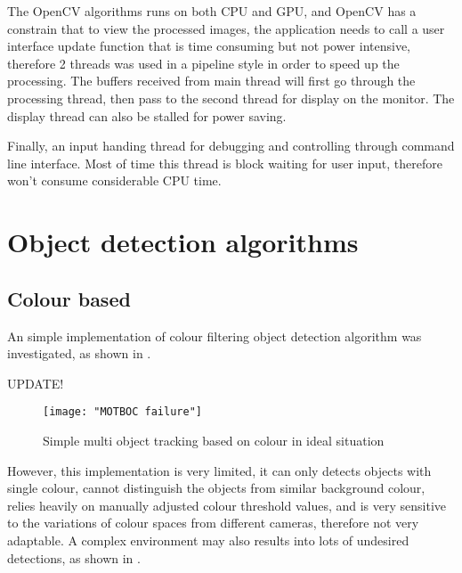 The OpenCV algorithms runs on both CPU and GPU, and OpenCV has a constrain that to view the processed images, the application needs to call a user interface update function that is time consuming but not power intensive, therefore 2 threads was used in a pipeline style in order to speed up the processing. The buffers received from main thread will first go through the processing thread, then pass to the second thread for display on the monitor. The display thread can also be stalled for power saving.


Finally, an input handing thread for debugging and controlling through command line interface. Most of time this thread is block waiting for user input, therefore won't consume considerable CPU time.

\section{Object detection algorithms}

\subsection{Colour based}

An simple implementation \cite{MOTBOC.git} of colour filtering object detection algorithm was investigated, as shown in .

{\color{red}UPDATE!}
\begin{figure}[H]
  \centering
  \texttt{[image: "MOTBOC failure"]}
  \caption{Simple multi object tracking based on colour \cite{MOTBOC.git} in ideal situation}
  \label{imp:MOTBOC}
\end{figure}

However, this implementation is very limited, it can only detects objects with single colour, cannot distinguish the objects from similar background colour, relies heavily on manually adjusted colour threshold values, and is very sensitive to the variations of colour spaces from different cameras, therefore not very adaptable. A complex environment may also results into lots of undesired detections, as shown in .


